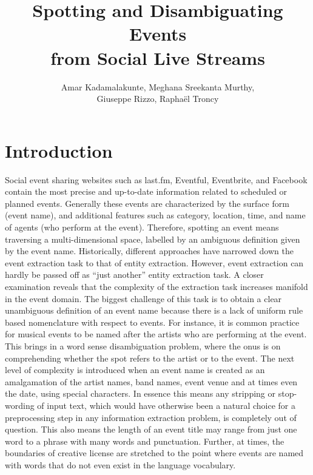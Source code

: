 \documentclass[10pt,a4paper]{article}
\author{Amar Kadamalakunte, Meghana Sreekanta Murthy,\\Giuseppe Rizzo, Rapha\"el Troncy}
\title{Spotting and Disambiguating Events\\from Social Live Streams}
\begin{document}
\maketitle
\section{Introduction}
\label{sec:introduction}
Social event sharing websites such as last.fm, Eventful, Eventbrite, and Facebook contain the most precise and up-to-date information related to scheduled or planned events. 
Generally these events are characterized by the surface form (event name), and additional features such as category, location, time, and name of agents (who perform at the event). Therefore, spotting an event means traversing a multi-dimensional space, labelled by an ambiguous definition given by the event name. 
Historically, different approaches have narrowed down the event extraction task to that of entity extraction. However, event extraction can hardly be passed off as ``just another'' entity extraction task. A closer examination reveals that the complexity of the extraction task increases manifold in the event domain. The biggest challenge of this task is to obtain a clear unambiguous definition of an event name because there is a lack of uniform rule based nomenclature with respect to events. 
For instance, it is common practice for musical events to be named after the artists who are performing at the event. 
This brings in a word sense disambiguation problem, where the onus is on comprehending whether the spot refers to the artist or to the event. The next level of complexity is introduced when an event name is created as an amalgamation of the artist names, band names, event venue and at times even the date, using special characters. %
In essence this means any stripping or stop-wording of input text, which would have otherwise been a natural choice for a preprocessing step in any information extraction problem, is completely out of question. This also means the length of an event title may range from just one word to a phrase with many words and punctuation. Further, at times, the boundaries of creative license are stretched to the point where events are named with words that do not even exist in the language vocabulary. 
\end{document}
